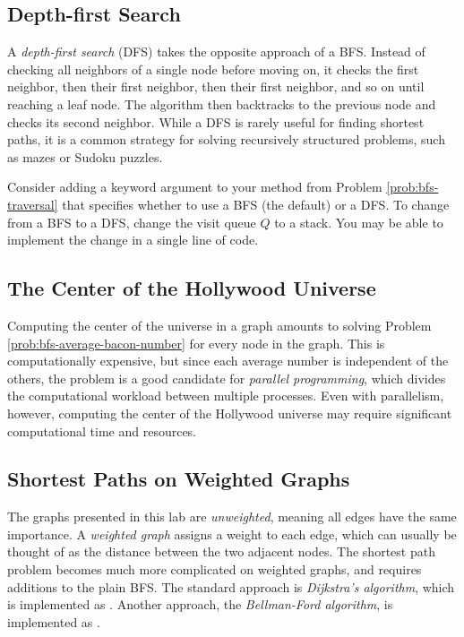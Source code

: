 \subsection*{Depth-first Search} %

A \emph{depth-first search} (DFS) takes the opposite approach of a BFS.
Instead of checking all neighbors of a single node before moving on, it checks the first neighbor, then their first neighbor, then their first neighbor, and so on until reaching a leaf node.
The algorithm then backtracks to the previous node and checks its second neighbor.
While a DFS is rarely useful for finding shortest paths, it is a common strategy for solving recursively structured problems, such as mazes or Sudoku puzzles.

Consider adding a keyword argument to your method from Problem \ref{prob:bfs-traversal} that specifies whether to use a BFS (the default) or a DFS.
To change from a BFS to a DFS, change the visit queue $Q$ to a stack.
You may be able to implement the change in a single line of code.

\subsection*{The Center of the Hollywood Universe} %

Computing the center of the universe in a graph amounts to solving Problem \ref{prob:bfs-average-bacon-number} for every node in the graph.
This is computationally expensive, but since each average number is independent of the others, the problem is a good candidate for \emph{parallel programming}, which divides the computational workload between multiple processes.
Even with parallelism, however, computing the center of the Hollywood universe may require significant computational time and resources.

\subsection*{Shortest Paths on Weighted Graphs} %

The graphs presented in this lab are \emph{unweighted}, meaning all edges have the same importance.
A \emph{weighted graph} assigns a weight to each edge, which can usually be thought of as the distance between the two adjacent nodes.
The shortest path problem becomes much more complicated on weighted graphs, and requires additions to the plain BFS.
The standard approach is \emph{Dijkstra's algorithm}, which is implemented as .
Another approach, the \emph{Bellman-Ford algorithm}, is implemented as .
